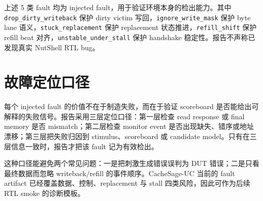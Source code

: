 \documentclass[UTF8,fontset=windows,zihao=-4]{ctexart}
\newcommand{\tightsection}[1]{\section{#1}\vspace{-0.2em}}
\begin{document}
上述 5 类 fault 均为 injected fault，用于验证环境本身的检出能力。其中 \texttt{drop\_dirty\_writeback} 保护 dirty victim 写回，\texttt{ignore\_write\_mask} 保护 byte lane 语义，\texttt{stuck\_replacement} 保护 replacement 状态推进，\texttt{refill\_shift} 保护 refill beat 对齐，\texttt{unstable\_under\_stall} 保护 handshake 稳定性。报告不声称已发现真实 NutShell RTL bug。

\tightsection{故障定位口径}
每个 injected fault 的价值不在于制造失败，而在于验证 scoreboard 是否能给出可解释的失败信号。报告采用三层定位口径：第一层检查 read response 或 final memory 是否 mismatch；第二层检查 monitor event 是否出现缺失、错序或地址漂移；第三层把失败归因到 stimulus、scoreboard 或 candidate model。只有在三层信息一致时，报告才把该 fault 记为有效检出。

这种口径能避免两个常见问题：一是把刺激生成错误误判为 DUT 错误；二是只看最终数据而忽略 writeback/refill 的事件顺序。CacheSage-UC 当前的 fault artifact 已经覆盖数据、控制、replacement 与 stall 四类风险，因此可作为后续 RTL smoke 的诊断模板。
\end{document}
